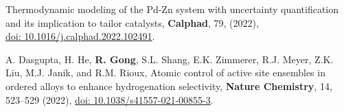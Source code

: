 \begin{etaremune}
Thermodynamic modeling of the Pd-Zn system with uncertainty quantification and its implication to tailor catalysts, 
\textbf{Calphad}, 79, (2022),\\
\href{https://doi.org/10.1016/j.calphad.2022.102491}
{doi: 10.1016/j.calphad.2022.102491}.
\item  A. Dasgupta, H. He, \textbf{R. Gong}, S.L. Shang, E.K. Zimmerer, R.J. Meyer, Z.K. Liu, M.J. Janik, and R.M. Rioux,
Atomic control of active site ensembles in ordered alloys to enhance hydrogenation selectivity, 
\textbf{Nature Chemistry}, 14, 523–529 (2022),
\href{https://doi.org/10.1038/s41557-021-00855-3}{doi: 10.1038/s41557-021-00855-3}.

\end{etaremune}
